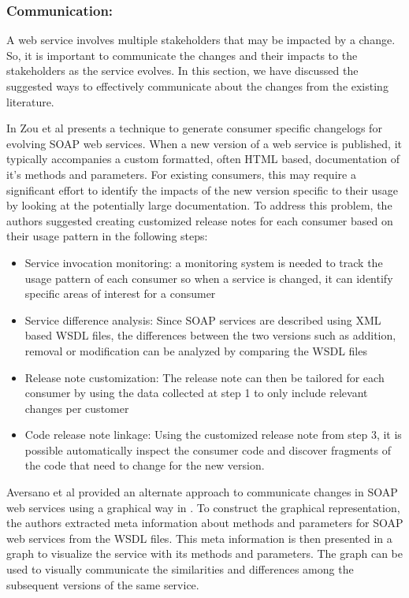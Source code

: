 \documentclass[runningheads,a4paper]{llncs}
\begin{document}
\subsubsection{Communication:}
A web service involves multiple stakeholders that may be impacted by a change. So, it is important to communicate the changes and their impacts to the stakeholders as the service evolves. In this section, we have discussed the suggested ways to effectively communicate about the changes from the existing literature.

In \cite{le2008synchronizing} Zou et al presents a technique to generate consumer specific changelogs for evolving SOAP web services. When a new version of a web service is published, it typically accompanies a custom formatted, often HTML based, documentation of it’s methods and parameters. For existing consumers, this may require a significant effort to identify the impacts of the new version specific to their usage by looking at the potentially large documentation. To address this problem, the authors suggested creating customized release notes for each consumer based on their usage pattern in the following steps:

\begin{itemize}
  \item Service invocation monitoring: a monitoring system is needed to track the usage pattern of each consumer so when a service is changed, it can identify specific areas of interest for a consumer
  \item Service difference analysis: Since SOAP services are described using XML based WSDL files, the differences between the two versions such as addition, removal or modification can be analyzed by comparing the WSDL files
  \item Release note customization: The release note can then be tailored for each consumer by using the data collected at step 1 to only include relevant changes per customer
  \item Code release note linkage: Using the customized release note from step 3, it is possible automatically inspect the consumer code and discover fragments of the code that need to change for the new version.
\end{itemize}

Aversano et al provided an alternate approach to communicate changes in SOAP web services using a graphical way in \cite{aversano2005visualizing}. To construct the graphical representation, the authors extracted meta information about methods and parameters for SOAP web services from the WSDL files. This meta information is then presented in a graph to visualize the service with its methods and parameters. The graph can be used to visually communicate the similarities and differences among the subsequent versions of the same service.
\end{document}
